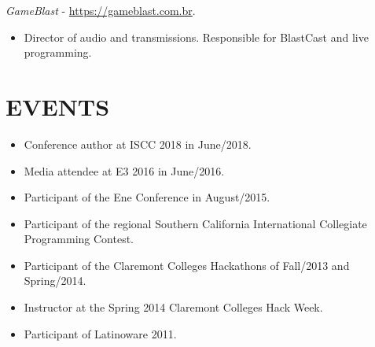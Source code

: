 \documentclass[margin]{res}
\begin{document}
\begin{resume}
			{\sl GameBlast} - \href{https://gameblast.com.br}{https://gameblast.com.br}.
			\begin{itemize}
				\item[] Director of audio and transmissions. Responsible for BlastCast and live programming.
			\end{itemize}
		
		\section{EVENTS}
			\begin{itemize}
				\item[] Conference author at ISCC 2018 in June/2018.
				\item[] Media attendee at E3 2016 in June/2016.
				\item[] Participant of the Ene Conference in August/2015.
				\item[] Participant of the regional Southern California International Collegiate Programming Contest.
				\item[] Participant of the Claremont Colleges Hackathons of Fall/2013 and Spring/2014.
				\item[] Instructor at the Spring 2014 Claremont Colleges Hack Week.
				\item[] Participant of Latinoware 2011.
			\end{itemize}


\end{resume}
\end{document}
